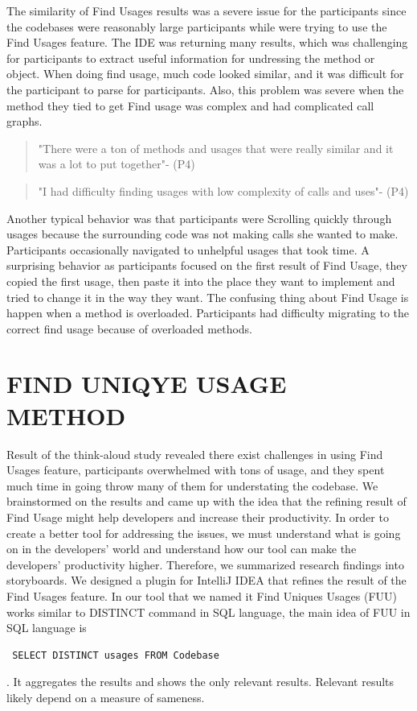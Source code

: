 \documentclass[conference]{IEEEtran}
\begin{document}
The similarity of Find Usages results was a severe issue for the participants since the codebases were reasonably large participants while were trying to use the Find Usages feature. The IDE was returning many results, which was challenging for participants to extract useful information for undressing the method or object. When doing find usage, much code looked similar, and it was difficult for the participant to parse for participants. Also, this problem was severe when the method they tied to get Find usage was complex and had complicated call graphs.

\begin{quote}"There were a ton of methods and usages that were really similar and it was a lot to put together"- (P4)\end{quote}
\begin{quote}"I had difficulty finding usages with low complexity of calls and uses"- (P4)\end{quote}

Another typical behavior was that participants were Scrolling quickly through usages because the surrounding code was not making calls she wanted to make. Participants occasionally navigated to unhelpful usages that took time. A surprising behavior as participants focused on the first result of Find Usage, they copied the first usage, then paste it into the place they want to implement and tried to change it in the way they want. The confusing thing about Find Usage is happen when a method is overloaded. Participants had difficulty migrating to the correct find usage because of overloaded methods.


\section{FIND UNIQYE USAGE METHOD}
Result of the think-aloud study revealed there exist challenges in using Find Usages feature, participants overwhelmed with tons of usage, and they spent much time in going throw many of them for understating the codebase. We brainstormed on the results and came up with the idea that the refining result of Find Usage might help developers and increase their productivity. In order to create a better tool for addressing the issues, we must understand what is going on in the developers' world and understand how our tool can make the developers' productivity higher. Therefore, we summarized research findings into storyboards. We designed a plugin for IntelliJ IDEA that refines the result of the Find Usages feature. In our tool that we named it Find Uniques Usages (FUU) works similar to DISTINCT command in SQL language, the main idea of FUU in SQL language is \begin{verbatim} SELECT DISTINCT usages FROM Codebase \end{verbatim}. It aggregates the results and shows the only relevant results. Relevant results likely depend on a measure of sameness.\par
\end{document}
